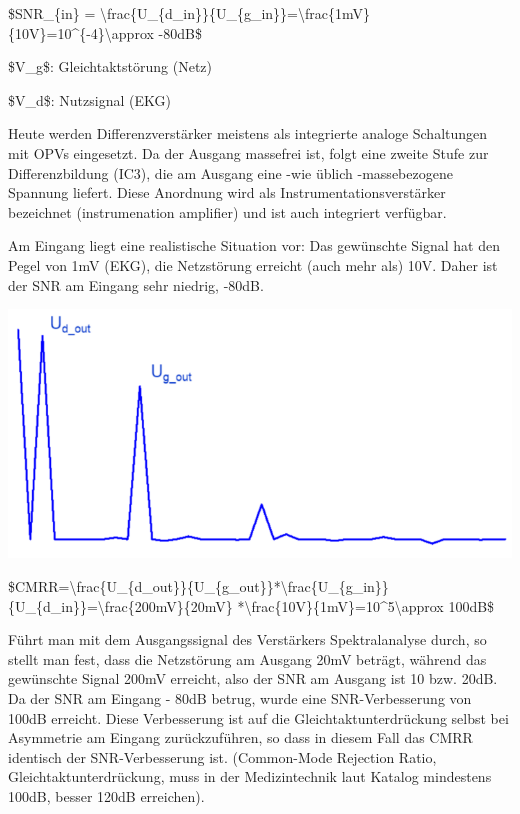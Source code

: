 \documentclass[a4paper]{article}
\begin{document}
\begin{multicols}{3}
  \begin{itemize*}
    \item \$SNR\_\{in\} = \textbackslash frac\{U\_\{d\_in\}\}\{U\_\{g\_in\}\}=\textbackslash frac\{1mV\}\{10V\}=10\^{}\{-4\}\textbackslash approx -80dB\$
    \item \$V\_g\$: Gleichtaktstörung (Netz)
    \item \$V\_d\$: Nutzsignal (EKG)
    \item Heute werden Differenzverstärker meistens als integrierte analoge Schaltungen mit OPVs eingesetzt. Da der Ausgang massefrei ist, folgt eine zweite Stufe zur Differenzbildung (IC3), die am Ausgang eine -wie üblich -massebezogene Spannung liefert. Diese Anordnung wird als Instrumentationsverstärker bezeichnet (instrumenation amplifier) und ist auch integriert verfügbar.
    \item Am Eingang liegt eine realistische Situation vor: Das gewünschte Signal hat den Pegel von 1mV (EKG), die Netzstörung erreicht (auch mehr als) 10V. Daher ist der SNR am Eingang sehr niedrig, -80dB.
    \item \includegraphics[width=.5\linewidth]{Assets/Biosignalverarbeitung-Diff-und-Gleichtakt2.png}
    \item \$CMRR=\textbackslash frac\{U\_\{d\_out\}\}\{U\_\{g\_out\}\}*\textbackslash frac\{U\_\{g\_in\}\}\{U\_\{d\_in\}\}=\textbackslash frac\{200mV\}\{20mV\} *\textbackslash frac\{10V\}\{1mV\}=10\^{}5\textbackslash approx 100dB\$
    \item Führt man mit dem Ausgangssignal des Verstärkers Spektralanalyse durch, so stellt man fest, dass die Netzstörung am Ausgang 20mV beträgt, während das gewünschte Signal 200mV erreicht, also der SNR am Ausgang ist 10 bzw. 20dB. Da der SNR am Eingang - 80dB betrug, wurde eine SNR-Verbesserung von 100dB erreicht. Diese Verbesserung ist auf die Gleichtaktunterdrückung selbst bei Asymmetrie am Eingang zurückzuführen, so dass in diesem Fall das CMRR identisch der SNR-Verbesserung ist. (Common-Mode Rejection Ratio, Gleichtaktunterdrückung, muss in der Medizintechnik laut Katalog mindestens 100dB, besser 120dB erreichen).
  \end{itemize*}


\end{multicols}
\end{document}
